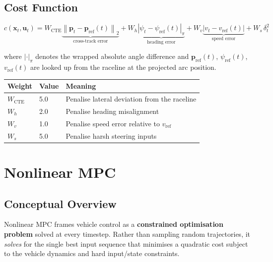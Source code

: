\documentclass[11pt]{article}
\begin{document}
\subsection{Cost Function}

\[
c(\bm{x}_t, \bm{u}_t) =
  W_{\text{CTE}} \underbrace{\left\|\bm{p}_t - \bm{p}_{\text{ref}}(t)\right\|_2}_{\text{cross-track error}}
+ W_h \underbrace{\left|\psi_t - \psi_{\text{ref}}(t)\right|_{\pi}}_{\text{heading error}}
+ W_v \underbrace{\left|v_t - v_{\text{ref}}(t)\right|}_{\text{speed error}}
+ W_s\, \delta_t^2
\]

where $|\cdot|_\pi$ denotes the wrapped absolute angle difference and
$\bm{p}_{\text{ref}}(t)$, $\psi_{\text{ref}}(t)$, $v_{\text{ref}}(t)$ are
looked up from the raceline at the projected arc position.

\medskip
\begin{center}
\begin{tabular}{lll}
\toprule
Weight & Value & Meaning \\
\midrule
$W_{\text{CTE}}$ & 5.0 & Penalise lateral deviation from the raceline \\
$W_h$            & 2.0 & Penalise heading misalignment \\
$W_v$            & 1.0 & Penalise speed error relative to $v_{\text{ref}}$ \\
$W_s$            & 5.0 & Penalise harsh steering inputs \\
\bottomrule
\end{tabular}
\end{center}


\section{Nonlinear MPC}

\subsection{Conceptual Overview}

Nonlinear MPC frames vehicle control as a \textbf{constrained optimisation
problem} solved at every timestep.  Rather than sampling random trajectories,
it \emph{solves} for the single best input sequence that minimises a quadratic
cost subject to the vehicle dynamics and hard input/state constraints.
\end{document}
